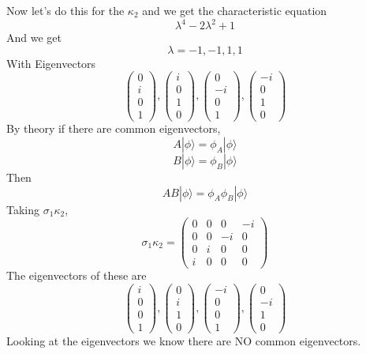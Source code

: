 \documentclass[letter]{article}
\begin{document}
Now let's do this for the $\kappa_2$ and we get the characteristic equation
\[
\lambda^{4} - 2 \lambda^2 + 1
\] 
And we get 
\[
\lambda = -1,-1,1,1
\] 
With Eigenvectors
\[
\begin{pmatrix} 0\\i\\0\\1 \end{pmatrix} 
,
\begin{pmatrix} i\\0\\1\\0 \end{pmatrix} ,
\begin{pmatrix} 0\\-i\\0\\1 \end{pmatrix} ,
\begin{pmatrix} -i\\0\\1\\0 \end{pmatrix} 
\] 
By theory if there are common eigenvectors, 
\[
A | \phi \rangle  = \phi_A | \phi \rangle 
\] 
\[
B | \phi \rangle  = \phi_B | \phi \rangle 
\] 
Then
\[
AB | \phi \rangle  = \phi_A \phi_B | \phi \rangle 
\]
Taking $\sigma_1 \kappa_2$, 
\[
\sigma_1 \kappa_2 = 
\begin{pmatrix} 0&0&0&-i\\0&0&-i&0\\0&i&0&0\\i&0&0&0 \end{pmatrix} 
\] 
The eigenvectors of these are 
\[
\begin{pmatrix} i\\0\\0\\1 \end{pmatrix} ,
\begin{pmatrix} 0\\i\\1\\0 \end{pmatrix} ,
\begin{pmatrix} -i\\0\\0\\1 \end{pmatrix} ,
\begin{pmatrix} 0\\-i\\1\\0 \end{pmatrix} 
\]
Looking at the eigenvectors we know there are NO common eigenvectors.
\end{document}
